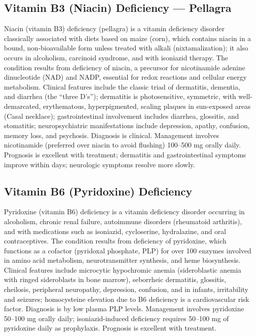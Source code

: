 \subsection{Vitamin B3 (Niacin) Deficiency --- Pellagra}
\label{sec:Vitamin B3 Deficiency}
Niacin (vitamin B3) deficiency (pellagra) is a vitamin deficiency disorder classically associated with diets based on maize (corn), which contains niacin in a bound, non-bioavailable form unless treated with alkali (nixtamalization); it also occurs in alcoholism, carcinoid syndrome, and with isoniazid therapy. The condition results from deficiency of niacin, a precursor for nicotinamide adenine dinucleotide (NAD) and NADP, essential for redox reactions and cellular energy metabolism. Clinical features include the classic triad of dermatitis, dementia, and diarrhea (the ``three D's''); dermatitis is photosensitive, symmetric, with well-demarcated, erythematous, hyperpigmented, scaling plaques in sun-exposed areas (Casal necklace); gastrointestinal involvement includes diarrhea, glossitis, and stomatitis; neuropsychiatric manifestations include depression, apathy, confusion, memory loss, and psychosis. Diagnosis is clinical. Management involves nicotinamide (preferred over niacin to avoid flushing) 100--500 mg orally daily. Prognosis is excellent with treatment; dermatitis and gastrointestinal symptoms improve within days; neurologic symptoms resolve more slowly.

\subsection{Vitamin B6 (Pyridoxine) Deficiency}
\label{sec:Vitamin B6 Deficiency}
Pyridoxine (vitamin B6) deficiency is a vitamin deficiency disorder occurring in alcoholism, chronic renal failure, autoimmune disorders (rheumatoid arthritis), and with medications such as isoniazid, cycloserine, hydralazine, and oral contraceptives. The condition results from deficiency of pyridoxine, which functions as a cofactor (pyridoxal phosphate, PLP) for over 100 enzymes involved in amino acid metabolism, neurotransmitter synthesis, and heme biosynthesis. Clinical features include microcytic hypochromic anemia (sideroblastic anemia with ringed sideroblasts in bone marrow), seborrheic dermatitis, glossitis, cheilosis, peripheral neuropathy, depression, confusion, and in infants, irritability and seizures; homocysteine elevation due to B6 deficiency is a cardiovascular risk factor. Diagnosis is by low plasma PLP levels. Management involves pyridoxine 50--100 mg orally daily; isoniazid-induced deficiency requires 50--100 mg of pyridoxine daily as prophylaxis. Prognosis is excellent with treatment.

